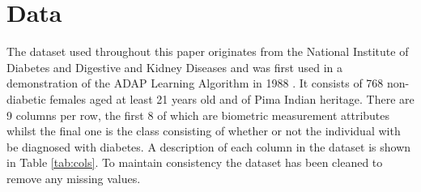 \section{Data}
\label{sec:data}


The dataset used throughout this paper originates from the National Institute of Diabetes and Digestive and Kidney Diseases and was first used in a demonstration of the ADAP Learning Algorithm in 1988 \cite{pima}. It consists of 768 non-diabetic females aged at least 21 years old and of Pima Indian heritage. There are 9 columns per row, the first 8 of which are biometric measurement attributes whilst the final one is the class consisting of whether or not the individual with be diagnosed with diabetes. A description of each column in the dataset is shown in Table \ref{tab:cols}. To maintain consistency the dataset has been cleaned to remove any missing values.

